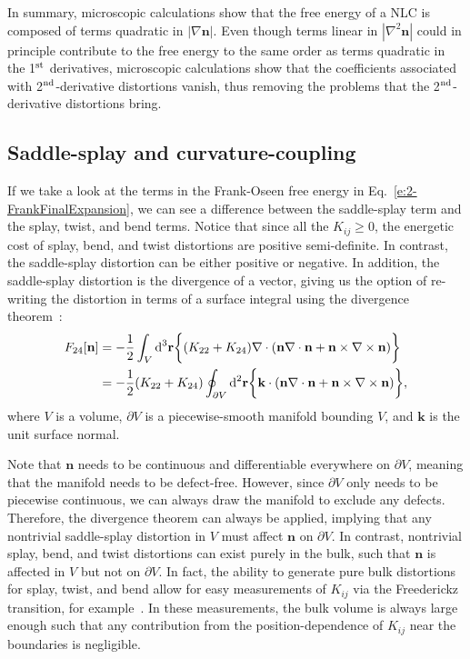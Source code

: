 In summary, microscopic calculations show that the free energy of a NLC is composed of terms quadratic in $|\nabla \mathbf{n}|$.
Even though terms linear in $|\nabla ^2 \mathbf{n}|$ could in principle contribute to the free energy to the same order as terms quadratic in the 1$^\textup{\rm st}$ derivatives, microscopic calculations show that the coefficients associated with 2$^\textup{\rm nd}$-derivative distortions vanish, thus removing the problems that the 2$^\textup{\rm nd}$-derivative distortions bring.


\subsection{Saddle-splay and curvature-coupling}
If we take a look at the terms in the Frank-Oseen free energy in Eq.~\ref{e:2-FrankFinalExpansion}, we can see a difference between the saddle-splay term and the splay, twist, and bend terms.
Notice that since all the $K_{ij} \geq 0$, the energetic cost of splay, bend, and twist distortions are positive semi-definite.
In contrast, the saddle-splay distortion can be either positive or negative.
In addition, the saddle-splay distortion is the divergence of a vector, giving us the option of re-writing the distortion in terms of a surface integral using the divergence theorem~\cite{RN230}:
\begin{align}
  F_{24}[\mathbf{n}] &= - \frac{1}{2}\int_{V} \textup{d}^3  \mathbf{r} \bigg \{ (K_{22} + K_{24})  \nabla \cdot (\mathbf{n}\nabla \cdot \mathbf{n} + \mathbf{n} \times \nabla \times \mathbf{n}) \bigg \}\label{e:2-F24GaussA}  \\ &=
  - \frac{1}{2}(K_{22} + K_{24}) \oint_{\partial V} \textup{d}^2  \mathbf{r} \bigg \{   \mathbf{k} \cdot (\mathbf{n}\nabla \cdot \mathbf{n} + \mathbf{n} \times \nabla \times \mathbf{n}) \bigg \},\label{e:2-F24GaussB}
\end{align}
where $V$ is a volume, $\partial V$ is a piecewise-smooth manifold bounding $V$, and $\mathbf{k}$ is the unit surface normal.

Note that $\mathbf{n}$ needs to be continuous and differentiable everywhere on $\partial V$, meaning that the manifold needs to be defect-free.
However, since $\partial V$ only needs to be piecewise continuous, we can always draw the manifold to exclude any defects.
Therefore, the divergence theorem can always be applied, implying that any nontrivial saddle-splay distortion in $V$ must affect $\mathbf{n}$ on $\partial V$.
In contrast, nontrivial splay, bend, and twist distortions can exist purely in the bulk, such that $\mathbf{n}$ is affected in $V$ but not on $\partial V$.
In fact, the ability to generate pure bulk distortions for splay, twist, and bend allow for easy measurements of $K_{ij}$ via the Freederickz transition, for example~\cite{RN212,RN213,RN33,RN188,RN182,RN183}.
In these measurements, the bulk volume is always large enough such that any contribution from the position-dependence of $K_{ij}$ near the boundaries is negligible.

